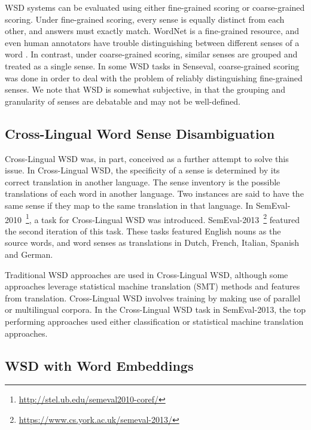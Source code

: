 WSD systems can be evaluated using either fine-grained scoring or
coarse-grained scoring. Under fine-grained scoring, every sense is
equally distinct from each other, and answers must exactly match. 
WordNet is a fine-grained resource, and even human annotators have
trouble distinguishing between different senses of a word
\cite{edmonds2002introduction}.  In contrast, under coarse-grained
scoring, similar senses are grouped and treated as a single sense.  In
some WSD tasks in Senseval, coarse-grained scoring was done in order
to deal with the problem of reliably distinguishing fine-grained
senses. We note that WSD is somewhat subjective, in that the grouping
and granularity of senses are debatable and may not be well-defined.

\subsection{Cross-Lingual Word Sense Disambiguation}
Cross-Lingual WSD was, in part, conceived as a further attempt to
solve this issue. In Cross-Lingual WSD, the specificity of a sense is
determined by its correct translation in another language. The sense
inventory is the possible translations of each word in another
language. Two instances are said to have the same sense if they map to
the same translation in that language. In
SemEval-2010~\cite{Lefever2010}\footnote{\url{http://stel.ub.edu/semeval2010-coref/}},
a task for Cross-Lingual WSD was
introduced. SemEval-2013~\cite{Lefever2013}\footnote{\url{https://www.cs.york.ac.uk/semeval-2013/}}
featured the second iteration of this task. These tasks featured
English nouns as the source words, and word senses as translations in
Dutch, French, Italian, Spanish and German.

Traditional WSD approaches are used in Cross-Lingual WSD, although
some approaches leverage statistical machine translation (SMT) methods
and features from translation. Cross-Lingual WSD involves training by
making use of parallel or multilingual corpora. In the Cross-Lingual
WSD task in SemEval-2013, the top performing approaches used either
classification or statistical machine translation approaches.

\subsection{WSD with Word Embeddings}

